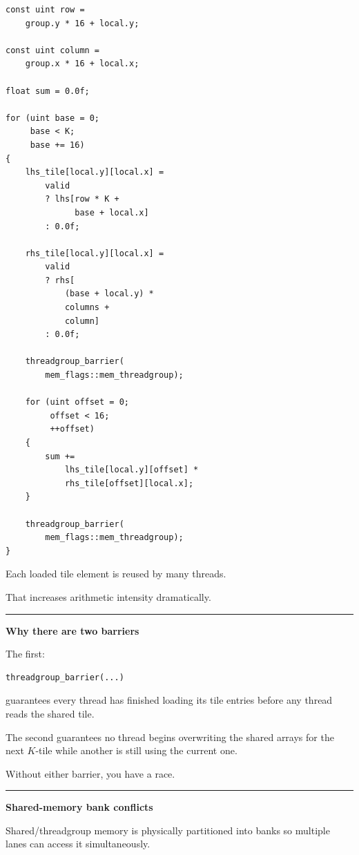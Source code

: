 \protect{}\label{tun1bn}%
\begin{verbatim}
const uint row =
    group.y * 16 + local.y;

const uint column =
    group.x * 16 + local.x;

float sum = 0.0f;

for (uint base = 0;
     base < K;
     base += 16)
{
    lhs_tile[local.y][local.x] =
        valid
        ? lhs[row * K +
              base + local.x]
        : 0.0f;

    rhs_tile[local.y][local.x] =
        valid
        ? rhs[
            (base + local.y) *
            columns +
            column]
        : 0.0f;

    threadgroup_barrier(
        mem_flags::mem_threadgroup);

    for (uint offset = 0;
         offset < 16;
         ++offset)
    {
        sum +=
            lhs_tile[local.y][offset] *
            rhs_tile[offset][local.x];
    }

    threadgroup_barrier(
        mem_flags::mem_threadgroup);
}
\end{verbatim}

Each loaded tile element is reused by many threads.

That increases arithmetic intensity dramatically.

\begin{center}\rule{0.5\linewidth}{0.5pt}\end{center}

\textbf{Why there are two barriers}

The first:

\protect{}\label{lzwp5h}%
\begin{verbatim}
threadgroup_barrier(...)
\end{verbatim}

guarantees every thread has finished loading its tile entries before any thread reads the shared tile.

The second guarantees no thread begins overwriting the shared arrays for the next \(K\)-tile while another is still using the current one.

Without either barrier, you have a race.

\begin{center}\rule{0.5\linewidth}{0.5pt}\end{center}

\textbf{Shared-memory bank conflicts}

Shared/threadgroup memory is physically partitioned into banks so multiple lanes can access it simultaneously.

